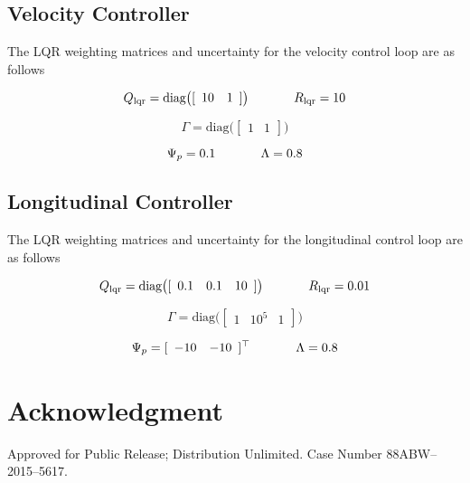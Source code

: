 \documentclass[]{../sty/aiaa-tc}
\newcommand{\bibsourcepath}{../bib/aiaa-gnc-2016}
\theoremstyle{examplestyle}
\begin{document}
  \subsection*{Velocity Controller}

  The LQR weighting matrices and uncertainty for the velocity control loop are as follows

  \begin{equation*}
    Q_{\text{lqr}} = \text{diag}\bigr([
    \begin{array}{cc}
      10 & 1
    \end{array}]
    \bigr)
    \hspace{0.5in}
    R_{\text{lqr}} = 10
  \end{equation*}

  \begin{equation*}
    \Gamma = \text{diag}\bigr([
    \begin{array}{ccc}
      1 & 1
    \end{array}]
    \bigr)
  \end{equation*}

  \begin{equation*}
    \Psi_{p} = 0.1
    \hspace{0.5in}
    \Lambda = 0.8
  \end{equation*}

  \subsection*{Longitudinal Controller}

  The LQR weighting matrices and uncertainty for the longitudinal control loop are as follows

  \begin{equation*}
    Q_{\text{lqr}} = \text{diag}\bigr(
    [
    \begin{array}{ccc}
      0.1 & 0.1 & 10
    \end{array}]
    \bigr)
    \hspace{0.5in}
    R_{\text{lqr}} = 0.01
  \end{equation*}

  \begin{equation*}
    \Gamma = \text{diag}\bigr([
    \begin{array}{ccc}
      1 & 10^{5} & 1
    \end{array}]
    \bigr)
  \end{equation*}

  \begin{equation*}
    \Psi_{p} =[
    \begin{array}{ccc}
      -10 & -10
    \end{array}]^{\top}
    \hspace{0.5in}
    \Lambda=0.8
  \end{equation*}

  \section{Acknowledgment}

  Approved for Public Release; Distribution Unlimited. Case Number 88ABW--2015--5617.

  
  
\end{document}
